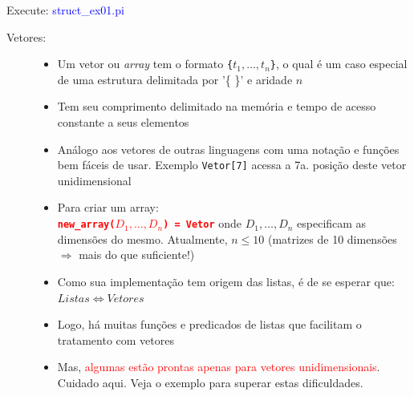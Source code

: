 \documentclass[10pt]{beamer}
\begin{document}
\begin{frame} [allowframebreaks=0.9]
\begin{description}
    \end{description}
     
     Execute: \textcolor{blue}{struct\_ex01.pi}\\
         
     
     \newpage
     
     
    \begin{description}      
     
      
       \item[Vetores:] 
           
           \begin{itemize}
  \item Um vetor ou \textit{array} tem o formato \texttt{\{$t_1,…,t_n$\}}, o qual é um caso especial de uma estrutura delimitada por  '\{  \}’ e aridade $n$
  \item Tem seu comprimento delimitado na memória e tempo de acesso 
  constante a seus elementos
  
  \item Análogo aos vetores de outras linguagens com uma notação e funções bem fáceis de usar. Exemplo \texttt{Vetor[7]} acessa a 7a. posição deste vetor unidimensional
             
  \item Para criar um array:\\
       \textbf{\textcolor{red}{\texttt{new\_array($D_1, …, D_n$) = Vetor}}} onde $D_1, …, D_n$ especificam as dimensões do mesmo. Atualmente, $n \le 10$ (matrizes de  10 dimensões $\Rightarrow $ mais do que suficiente!) 
             
    \item Como sua implementação tem origem das listas, é de se esperar que: $Listas \Leftrightarrow Vetores$           
    
 \item Logo, há muitas funções e predicados de listas  que facilitam o tratamento  com vetores
    
  \item Mas, \textcolor{red}{algumas estão prontas apenas para vetores unidimensionais}. Cuidado aqui. Veja o exemplo para superar estas dificuldades.  
            
           \end{itemize}
 \end{description}
           

\end{frame}
\end{document}

